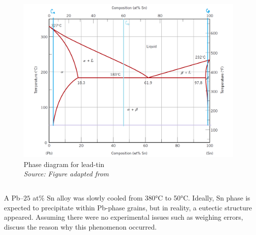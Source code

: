 \begin{figure}[h]
    \centering
    \includegraphics[width=1\textwidth]{graficas/diagrama.png}
    \caption{Phase diagram for lead-tin \\
    \textit{Source: Figure adapted from \citep{callister2010materials}}}
    \label{fig:diagrama}
\end{figure}


\subsection{}
A Pb–$25$ at$\%$ Sn alloy was slowly cooled from 380°C to 50°C. Ideally, Sn phase is expected to precipitate within Pb-phase grains, but in reality, a eutectic structure appeared. Assuming there were no experimental issues such as weighing errors, discuss the reason why this phenomenon occurred.